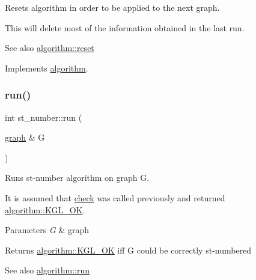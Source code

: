Resets algorithm in order to be applied to the next graph. 

This will delete most of the information obtained in the last run.

\begin{DoxySeeAlso}{See also}
\mbox{\hyperlink{classalgorithm_a21aba63d066ae7897de6ca7d8425c408}{algorithm\+::reset}} 
\end{DoxySeeAlso}


Implements \mbox{\hyperlink{classalgorithm_a21aba63d066ae7897de6ca7d8425c408}{algorithm}}.

\mbox{\label{classst__number_af902a0c05d07d47b587e8f7a6b7beaa1}} 
\subsubsection{\texorpdfstring{run()}{run()}}
{\footnotesize\ttfamily int st\+\_\+number\+::run (\begin{DoxyParamCaption}\item[{\mbox{\hyperlink{classgraph}{graph}} \&}]{G }\end{DoxyParamCaption})\hspace{0.3cm}{\ttfamily [virtual]}}



Runs st-\/number algorithm on graph {\ttfamily G}. 

It is assumed that \mbox{\hyperlink{classst__number_a2aad4550b821c52d6998bff35fd8648f}{check}} was called previously and returned \mbox{\hyperlink{classalgorithm_af1a0078e153aa99c24f9bdf0d97f6710aae4c1cd7fe8d8cf4b143241a6e7c31cf}{algorithm\+::\+K\+G\+L\+\_\+\+OK}}.


\begin{DoxyParams}{Parameters}
{\em G} & graph\\
\hline
\end{DoxyParams}
\begin{DoxyReturn}{Returns}
\mbox{\hyperlink{classalgorithm_af1a0078e153aa99c24f9bdf0d97f6710aae4c1cd7fe8d8cf4b143241a6e7c31cf}{algorithm\+::\+K\+G\+L\+\_\+\+OK}} iff {\ttfamily G} could be correctly st-\/numbered
\end{DoxyReturn}
\begin{DoxySeeAlso}{See also}
\mbox{\hyperlink{classalgorithm_a734b189509a8d6b56b65f8ff772d43ca}{algorithm\+::run}} 
\end{DoxySeeAlso}



